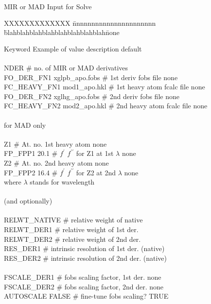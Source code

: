 \documentclass{report}
\begin{document}
\begin{table} [htb]
\caption {\large MIR or MAD Input for Solve}
\label{table-mir}

\begin{tabbing}
XXXXXXXXXXXXX \= nnnnnnnnnnnnnnnnnnnnnn \= 
blahblahblahblahblahblahblahblah\= none \kill

Keyword \> Example of value \> description \> default \\
\\

NDER  \> \# no. of MIR or MAD derivatives  \\
FO\_DER\_FN1 \> xglpb\_apo.fobs \> \# 1st deriv fobs file \> none \\
FC\_HEAVY\_FN1 \> mod1\_apo.hkl \> \# 1st heavy atom fcalc file \> none \\
FO\_DER\_FN2 \> xglhg\_apo.fobs \> \# 2nd deriv fobs file \> none \\
FC\_HEAVY\_FN2 \> mod2\_apo.hkl \> \# 2nd heavy atom fcalc file \> none \\
\\
\> for MAD only      \> \\
\\
Z1  \> \# At. no. 1st heavy atom \> none\\
FP\_FPP1  20.1 \> \# $f^\prime$ $f^{\prime\prime}$ for Z1 at 1st $\lambda$ \> none \\
Z2  \> \# At. no. 2nd heavy atom \> none\\
FP\_FPP2  16.4 \> \# $f^\prime$ $f^{\prime\prime}$ for Z2 at 2nd $\lambda$ \> none \\
\>  where $\lambda$ stands for wavelength  \> \\
\
\\
\> (and optionally)  \> \\
\\
RELWT\_NATIVE  \> \# relative weight of native   \\
RELWT\_DER1  \> \# relative weight of 1st der.   \\
RELWT\_DER2 \> 0.9 \> \# relative weight of 2nd der.  \> 1 \\
RES\_DER1  \> \# intrinsic resolution of 1st der. \> (native) \\
RES\_DER2 \> 1.9 \> \# intrinsic resolution of 2nd der. \> (native) \\
\\
FSCALE\_DER1   \> \# fobs scaling factor, 1st der. \> none \\
FSCALE\_DER2  \> 1.1 \> \# fobs scaling factor, 2nd der. \> none \\
AUTOSCALE  \> FALSE  \> \#  fine-tune fobs scaling\index{scaling}? \> TRUE \\     
\end{tabbing} 
\end{table}
\end{document}
